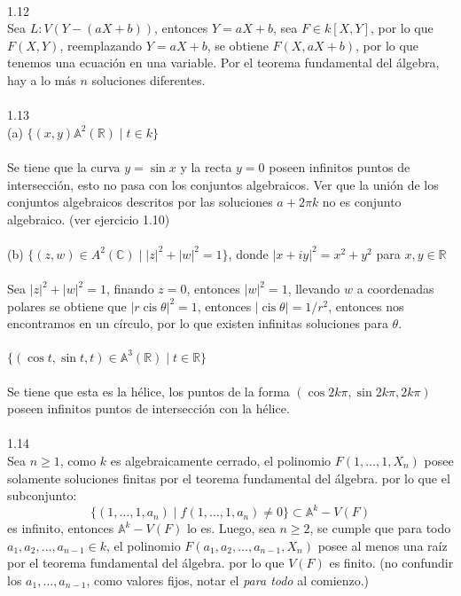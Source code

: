 \documentclass{article}
\newcommand{\R}{\mathbb{R}}
\newcommand{\A}{\mathbb{A}}
\begin{document}
\\
1.12
\\
Sea $L: V(Y-(aX+b))$, entonces $Y=aX+b$, sea $F \in k[X,Y]$, por lo que $F(X,Y)$, reemplazando $Y=aX+b$, se obtiene $F(X,aX+b)$, por lo que tenemos una ecuación en una variable. Por el teorema fundamental del álgebra, hay a lo más $n$ soluciones diferentes.
\\
\\
1.13
\\
(a) $\{(x,y) \A^{2}(\R) \mid t \in k\}$
\\
\\
Se tiene que la curva $y=\sin{x}$ y la recta $y=0$ poseen infinitos puntos de intersección, esto no pasa con los conjuntos algebraicos. Ver que la unión de los conjuntos algebraicos descritos por las soluciones $a+2 \pi k$ no es conjunto algebraico. (ver ejercicio 1.10)
\\
\\
(b) $\{(z,w) \in A^{2}(\mathbb{C}) \mid |z|^2+|w|^2 =1\}$, donde $|x+iy|^{2}=x^2 +y^2$ para $x,y \in \R$
\\
\\
Sea $|z|^{2} + |w|^{2}=1$, finando $z=0$, entonces $|w|^{2}=1$, llevando $w$ a coordenadas polares se obtiene que $|r \operatorname{cis}\theta|^{2} =1$, entonces $|\operatorname{cis}{\theta}|=1/r^{2}$, entonces nos encontramos en un círculo, por lo que existen infinitas soluciones para $\theta$.
\\
\\
$\{(\cos{t},\sin{t},t) \in \A^{3}(\R) \mid t \in \R \}$
\\
\\
Se tiene que esta es la hélice, los puntos de la forma $(\cos{2k \pi}, \sin{2k \pi}, 2k \pi)$ poseen infinitos puntos de intersección con la hélice.
\\
\\
1.14
\\
Sea $n \geq 1$, como $k$ es algebraicamente cerrado, el polinomio $F(1,\dots,1,X_n)$ posee solamente soluciones finitas por el teorema fundamental del álgebra. por lo que el subconjunto:
\begin{equation*}
    \{(1,\dots , 1,a_n) \mid f(1,\dots,1,a_n) \neq 0 \} \subset \A^{k}-V(F)
\end{equation*}
es infinito, entonces $\A^{k}-V(F)$ lo es. Luego, sea $n \geq 2$, se cumple que para todo $a_1,a_2,\dots,a_{n-1} \in k$, el polinomio $F(a_1,a_2,\dots,a_{n-1},X_{n})$ posee al menos una raíz por el teorema fundamental del álgebra. por lo que $V(F)$ es finito. (no confundir los $a_1,\dots,a_{n-1}$, como valores fijos, notar el \textit{para todo} al comienzo.) 
\end{document}
